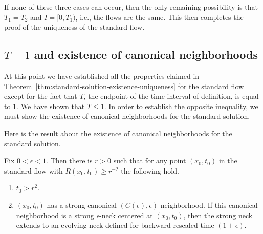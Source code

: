 If none of these three cases can occur, then the only remaining
possibility is that $T_1=T_2$ and $I=[0,T_1)$, i.e., the flows are
the same. This then completes the proof of the uniqueness of the
standard flow.


\subsection{$T=1$ and existence of canonical neighborhoods}

At this point we have established all the properties claimed in
Theorem~\ref{thm:standard-solution-existence-uniqueness} for the standard flow except for the fact that
$T$, the endpoint of the time-interval of definition, is equal to
$1$. We have shown that $T\le 1$. In order to establish the opposite
inequality, we must show the existence of canonical neighborhoods
for the standard solution.



Here is the result about the existence of canonical neighborhoods
for the standard solution.

\begin{theorem}
\label{thm:standard-solution-canonical-neighborhoods}
\label{R_0cannbhd}
Fix $0<\epsilon<1$.   Then there is $r>0$ such that for any point
$(x_0,t_0)$ in the standard flow with $R(x_0,t_0)\ge r^{-2}$ the
following hold.
\begin{enumerate}
\item[(1)] $t_0>r^2$.
\item[(2)] $(x_0,t_0)$ has a strong canonical
$(C(\epsilon),\epsilon)$-neighborhood. If this canonical neighborhood is a strong
$\epsilon$-neck centered at $(x_0,t_0)$, then the strong neck
extends to an evolving neck defined for backward rescaled time
$(1+\epsilon)$.
\end{enumerate}
\end{theorem}


